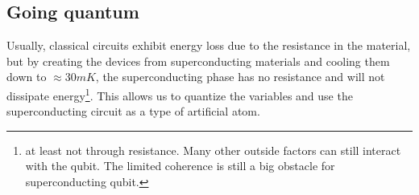 
\subsection{Going quantum}
 Usually, classical circuits exhibit energy loss due to the resistance in the material, but by creating the devices from superconducting materials and cooling them down to $\approx 30 \unit{mK}$, the superconducting phase has no resistance and will not dissipate energy\footnote{at least not through resistance. Many other outside factors can still interact with the qubit. The limited coherence is still a big obstacle for superconducting qubit.}. This allows us to quantize the variables and use the superconducting circuit as a type of artificial atom. 


